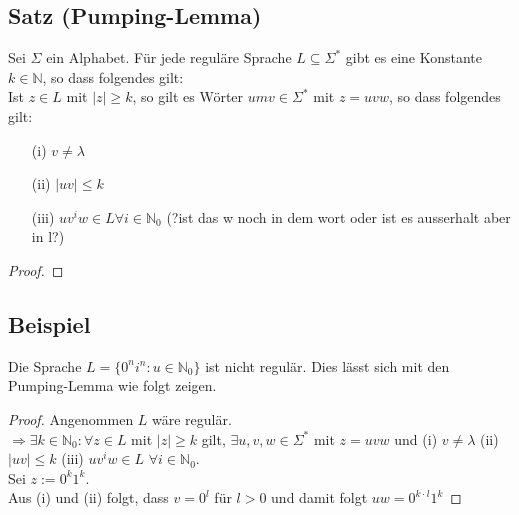\subsection{Satz (Pumping-Lemma)} Sei $\Sigma$ ein Alphabet. Für jede reguläre Sprache $L \subseteq \Sigma^*$ gibt es eine Konstante $k \in \mathbb{N}$, so dass folgendes gilt:\\ Ist $z \in L$ mit $|z| \geq k$, so gilt es Wörter $um v \in \Sigma^*$ mit $z = uvw$, so dass folgendes gilt:
\begin{itemize}
  \item [(i)]$v \not = \lambda$
  \item [(ii)]$|uv| \leq k$
  \item [(iii)]$uv^iw \in L \forall i \in \mathbb{N}_0$ (?ist das w noch in dem wort oder ist es ausserhalt aber in l?)
\end{itemize} 
\begin{proof}
\end{proof}

  \subsection{Beispiel} Die Sprache $L = \{0^n i^n : u \in \mathbb{N}_0\}$ ist nicht regulär. Dies lässt sich mit den Pumping-Lemma wie folgt zeigen.

  \begin{proof}
    Angenommen $L$ wäre regulär.\\
    $\Rightarrow \exists k \in \mathbb{N}_0 : \forall z \in L$ mit $|z| \geq k$ gilt, $\exists u, v, w \in \Sigma^*$ mit $z = uvw$ und (i) $v \not = \lambda$ (ii) $|uv| \leq k$ (iii) $uv^i w \in L$ $\forall i \in \mathbb{N}_0$. \\ Sei $z:= 0^k 1^k$. \\Aus (i) und (ii) folgt, dass $v = 0^l$ für $l > 0$ und damit folgt $uw = 0^{k\cdot l} 1^k$
  \end{proof}
  
